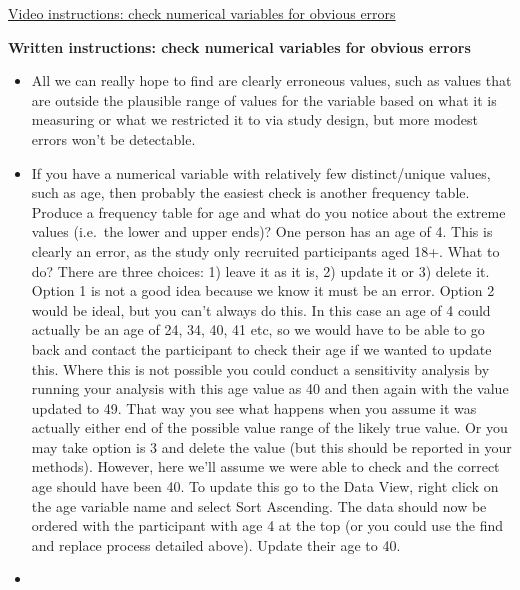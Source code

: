 \documentclass[
]{book}
\begin{document}
\href{https://youtu.be/Q51ex9lcqJs}{Video instructions: check numerical variables for obvious errors}

\textbf{Written instructions: check numerical variables for obvious errors}

\begin{itemize}
\item
  All we can really hope to find are clearly erroneous values, such as values that are outside the plausible range of values for the variable based on what it is measuring or what we restricted it to via study design, but more modest errors won't be detectable.
\item
  If you have a numerical variable with relatively few distinct/unique values, such as age, then probably the easiest check is another frequency table. Produce a frequency table for age and what do you notice about the extreme values (i.e.~the lower and upper ends)? One person has an age of 4. This is clearly an error, as the study only recruited participants aged 18+. What to do? There are three choices: 1) leave it as it is, 2) update it or 3) delete it. Option 1 is not a good idea because we know it must be an error. Option 2 would be ideal, but you can't always do this. In this case an age of 4 could actually be an age of 24, 34, 40, 41 etc, so we would have to be able to go back and contact the participant to check their age if we wanted to update this. Where this is not possible you could conduct a sensitivity analysis by running your analysis with this age value as 40 and then again with the value updated to 49. That way you see what happens when you assume it was actually either end of the possible value range of the likely true value. Or you may take option is 3 and delete the value (but this should be reported in your methods). However, here we'll assume we were able to check and the correct age should have been 40. To update this go to the Data View, right click on the age variable name and select Sort Ascending. The data should now be ordered with the participant with age 4 at the top (or you could use the find and replace process detailed above). Update their age to 40.
\item

\end{itemize}
\end{document}
